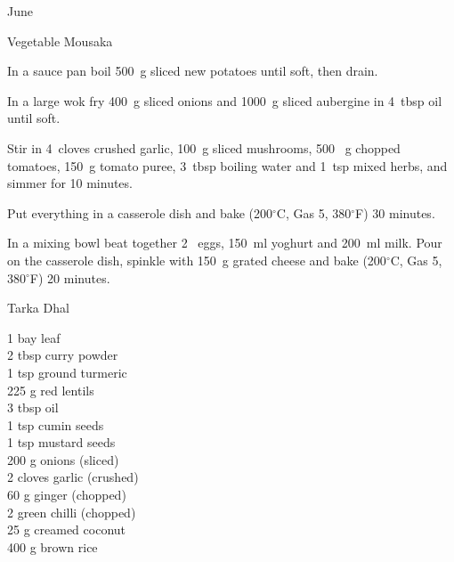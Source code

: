 \begin{menu}{June}
\begin{recipe}{2}{Vegetable Mousaka}
    \begin{instructions}
    \item 
        In a sauce pan boil
        500~g sliced new potatoes
        until soft,
        then drain.
      \item 
        In a large wok fry
        400~g sliced onions
        and
        1000~g sliced aubergine
        in
        4~tbsp  oil
        until soft.
      \item 
        Stir in
        4~cloves crushed garlic,
        100~g sliced mushrooms,
        500 ~g chopped tomatoes,
        150~g  tomato puree,
        3~tbsp  boiling water
        and
        1~tsp  mixed herbs,
        and simmer for 10 minutes.
      \item 
        Put everything in a casserole dish
        and bake (200$^{\circ}$C, Gas 5, 380$^{\circ}$F) 30 minutes.
      \item 
        In a mixing bowl beat together
        2~  eggs,
        150~ml  yoghurt
        and
        200~ml  milk.
        Pour on the casserole dish, spinkle with
        150~g grated cheese
        and bake (200$^{\circ}$C, Gas 5, 380$^{\circ}$F) 20 minutes.
      
    \end{instructions}
    \end{recipe}%
  
    \begin{recipe}{2}{Tarka Dhal}%
		\begin{ingredients}
		1  bay leaf  \\
	2 tbsp curry powder  \\
	1 tsp ground turmeric  \\
	225 g red lentils  \\
	3 tbsp oil  \\
	1 tsp cumin seeds  \\
	1 tsp mustard seeds  \\
	200 g onions (sliced) \\
	2 cloves garlic (crushed) \\
	60 g ginger (chopped) \\
	2  green chilli (chopped) \\
	25 g creamed coconut  \\
	400 g brown rice  \\
	
		\end{ingredients}
	
	

\end{recipe}
\end{menu}
